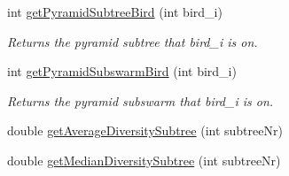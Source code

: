 \begin{CompactItemize}
int \hyperlink{classPyramidSwarm_c88d70f33dee3ffa27d63e2877c8a8ad}{getPyramidSubtreeBird} (int bird\_\-i)
\begin{CompactList}\small\item\em Returns the pyramid subtree that bird\_\-i is on. \item\end{CompactList}\item 
int \hyperlink{classPyramidSwarm_19babda715f51c14151187e83eb39627}{getPyramidSubswarmBird} (int bird\_\-i)
\begin{CompactList}\small\item\em Returns the pyramid subswarm that bird\_\-i is on. \item\end{CompactList}\item 
double \hyperlink{classPyramidSwarm_d8028bde5aa6ba3440350e3c6cca959f}{getAverageDiversitySubtree} (int subtreeNr)
\item 
double \hyperlink{classPyramidSwarm_d27c02e0ea3cad1e6ec3303bc64958e0}{getMedianDiversitySubtree} (int subtreeNr)
\end{CompactItemize}
